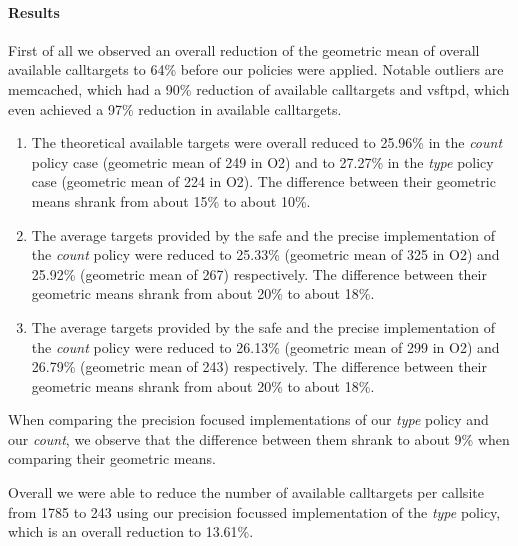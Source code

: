 \paragraph{Results} First of all we observed an overall reduction of the geometric mean of overall available calltargets to 64\% before our policies were applied. Notable outliers are memcached, which had a 90\% reduction of available calltargets and vsftpd, which even achieved a 97\% reduction in available calltargets.
\begin{enumerate}
\item The theoretical available targets were overall reduced to 25.96\% in the \textit{count} policy case  (geometric mean of 249 in O2) and to 27.27\% in the \textit{type} policy case  (geometric mean of 224 in O2). The difference between their geometric means shrank from about 15\% to about 10\%.
\item The average targets provided by the safe and the precise implementation of the \textit{count} policy were reduced to 25.33\% (geometric mean of 325 in O2) and 25.92\% (geometric mean of 267) respectively. The difference between their geometric means shrank from about 20\% to about 18\%.
\item The average targets provided by the safe and the precise implementation of the \textit{count} policy were reduced to 26.13\% (geometric mean of 299 in O2) and 26.79\% (geometric mean of 243) respectively. The difference between their geometric means shrank from about 20\% to about 18\%.
\end{enumerate}

When comparing the precision focused implementations of our \textit{type} policy and our \textit{count}, we observe that the difference between them shrank to about 9\% when comparing their geometric means.

Overall we were able to reduce the number of available calltargets per callsite from 1785 to 243 using our precision focussed implementation of the \textit{type} policy, which is an overall reduction to 13.61\%.

